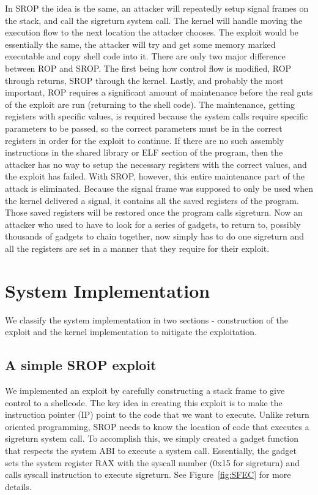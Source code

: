 \documentclass{sig-alternate-05-2015}
\begin{document}
In SROP the idea is the same, an attacker will repeatedly setup signal frames on the stack, and call the sigreturn system call. The kernel will handle moving the execution flow to the next location the attacker chooses. The exploit would be essentially the same, the attacker will try and get some memory marked executable and copy shell code into it. There are only two major difference between ROP and SROP. The first being how control flow is modified, ROP through returns, SROP through the kernel. Lastly, and probably the most important, ROP requires a significant amount of maintenance before the real guts of the exploit are run (returning to the shell code). The maintenance, getting registers with specific values, is required because the system calls require specific parameters to be passed, so the correct parameters must be in the correct registers in order for the exploit to continue. If there are no such assembly instructions in the shared library or ELF section of the program, then the attacker has no way to setup the necessary registers with the correct values, and the exploit has failed. With SROP, however, this entire maintenance part of the attack is eliminated. Because the signal frame was supposed to only be used when the kernel delivered a signal, it contains all the saved registers of the program. Those saved registers will be restored once the program calls sigreturn. Now an attacker who used to have to look for a series of gadgets, to return to, possibly thousands of gadgets to chain together, now simply has to do one sigreturn and all the registers are set in a manner that they require for their exploit.

\section {System Implementation}
We classify the system implementation in two sections - construction
of the exploit and the kernel implementation to mitigate the exploitation.

\subsection{A simple SROP exploit}
We implemented an exploit by carefully constructing a stack frame to give
control to a shellcode. The key idea in creating this exploit is to make
the instruction pointer (IP) point to the code that we want to execute. 
Unlike return oriented programming, SROP needs to know the location of 
code that executes a sigreturn system call. To accomplish this, we simply
created a gadget function that respects the system ABI to execute a system
call. Essentially, the gadget sets the system register RAX with the syscall
number (0x15 for sigreturn) and calls syscall instruction to execute sigreturn.
See Figure~\ref{fig:SFEC} for more details.
\end{document}
